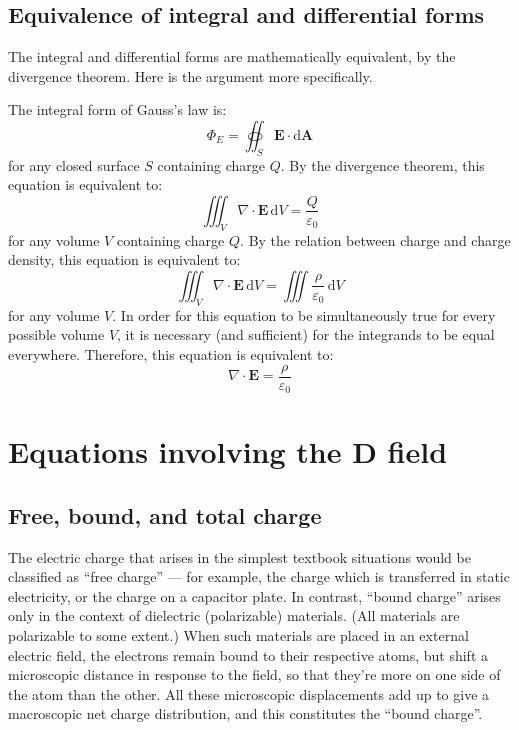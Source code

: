 \documentclass[a4paper]{article}
\begin{document}
\subsection{Equivalence of integral and differential forms}
The integral and differential forms are mathematically equivalent, by the divergence theorem. Here is the argument more specifically.

\begin{mdframed}[%
    style=mystyle,%
    frametitle={Outline of proof}]

The integral form of Gauss's law is:
\[
    \Phi_E = \oiint_S \mathbf{E} \cdot \mathrm{d} \mathbf{A}
\]
for any closed surface \(S\) containing charge \(Q\). By the divergence theorem, this equation is equivalent to: 
\[
    \iiint_V \nabla \cdot \mathbf{E} \, \mathrm{d}V  = \frac{Q}{\varepsilon_0}
\]
for any volume \(V\) containing charge \(Q\). By the relation between charge and charge density, this equation is equivalent to: 
\[
    \iiint_V \nabla \cdot \mathbf{E} \, \mathrm{d}V  = \iiint \frac{\rho}{\varepsilon_0} \, \mathrm{d}V
\]
for any volume \(V\). In order for this equation to be simultaneously true for every possible volume \(V\), it is necessary (and sufficient) for the integrands to be equal everywhere. Therefore, this equation is equivalent to: 
\[
    \nabla \cdot \mathbf{E} = \frac{\rho}{\varepsilon_0}
\]
\end{mdframed}

\section{Equations involving the \(\mathbf{D}\) field}
\subsection{Free, bound, and total charge}
The electric charge that arises in the simplest textbook situations would be classified as ``free charge'' --- for example, the charge which is transferred in static electricity, or the charge on a capacitor plate. In contrast, ``bound charge'' arises only in the context of dielectric (polarizable) materials. (All materials are polarizable to some extent.) When such materials are placed in an external electric field, the electrons remain bound to their respective atoms, but shift a microscopic distance in response to the field, so that they're more on one side of the atom than the other. All these microscopic displacements add up to give a macroscopic net charge distribution, and this constitutes the ``bound charge''. 
\end{document}
